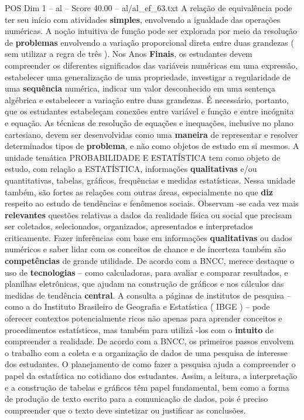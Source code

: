 \begin{textsample}{POS Dim 1 – al – Score 40.00 – al/al\_ef\_63.txt}
A relação de equivalência pode ter seu início com atividades \textbf{simples}, envolvendo a igualdade das operações numéricas.
A noção intuitiva de função pode ser explorada por meio da resolução de \textbf{problemas} envolvendo a variação proporcional direta entre duas grandezas ( sem utilizar a regra de três ).
Nos Anos \textbf{Finais}, os estudantes devem compreender os diferentes significados das variáveis numéricas em uma expressão, estabelecer uma generalização de uma propriedade, investigar a regularidade de uma \textbf{sequência} numérica, indicar um valor desconhecido em uma sentença algébrica e estabelecer a variação entre duas grandezas.
É necessário, portanto, que os estudantes estabeleçam conexões entre variável e função e entre incógnita e equação.
As técnicas de resolução de equações e inequações, inclusive no plano cartesiano, devem ser desenvolvidas como uma \textbf{maneira} de representar e resolver determinados tipos de \textbf{problema}, e não como objetos de estudo em si mesmos.
A unidade temática PROBABILIDADE E ESTATÍSTICA tem como objeto de estudo, com relação a ESTATÍSTICA, informações \textbf{qualitativas} e/ou quantitativas, tabelas, gráficos, frequências e medidas estatísticas.
Nessa unidade também, são fortes as relações com outras áreas, especialmente no que \textbf{diz} respeito ao estudo de tendências e fenômenos sociais.
Observam -se cada vez mais \textbf{relevantes} questões relativas a dados da realidade física ou social que precisam ser coletados, selecionados, organizados, apresentados e interpretados criticamente.
Fazer inferências com base em informações \textbf{qualitativas} ou dados numéricos e saber lidar com os conceitos de chance e de incerteza também são \textbf{competências} de grande utilidade.
De acordo com a BNCC, merece destaque o uso de \textbf{tecnologias} – como calculadoras, para avaliar e comparar resultados, e planilhas eletrônicas, que ajudam na construção de gráficos e nos cálculos das medidas de tendência \textbf{central}.
A consulta a páginas de institutos de pesquisa – como a do Instituto Brasileiro de Geografia e Estatística ( IBGE ) – pode oferecer contextos potencialmente ricos não apenas para aprender conceitos e procedimentos estatísticos, mas também para utilizá -los com o \textbf{intuito} de compreender a realidade.
De acordo com a BNCC, os primeiros passos envolvem o trabalho com a coleta e a organização de dados de uma pesquisa de interesse dos estudantes.
O planejamento de como fazer a pesquisa ajuda a compreender o papel da estatística no cotidiano dos estudantes.
Assim, a leitura, a interpretação e a construção de tabelas e gráficos têm papel fundamental, bem como a forma de produção de texto escrito para a comunicação de dados, pois é preciso compreender que o texto deve sintetizar ou justificar as conclusões.

\end{textsample}
